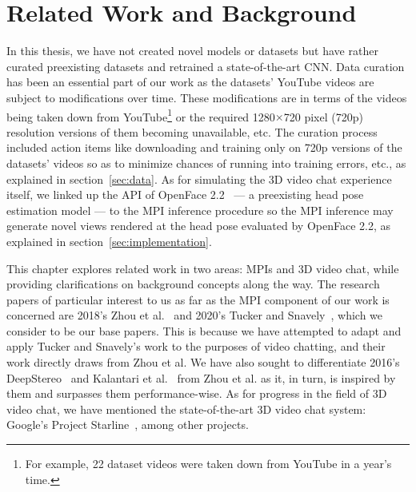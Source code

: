 \chapter{Related Work and Background}\label{ch2:related-work-background}

In this thesis, we have not created novel models or datasets but have rather curated preexisting datasets and retrained a state-of-the-art CNN. Data curation has been an essential part of our work as the datasets' YouTube videos are subject to modifications over time. These modifications are in terms of the videos being taken down from YouTube\footnote{For example, 22 dataset videos were taken down from YouTube in a year's time.} or the required 1280$\times$720 pixel (720p) resolution versions of them becoming unavailable, etc. The curation process included action items like downloading and training only on 720p versions of the datasets' videos so as to minimize chances of running into training errors, etc., as explained in section~\ref{sec:data}. As for simulating the 3D video chat experience itself, we linked up the API of OpenFace 2.2~\cite{baltrusaitis_openface_2018} --- a preexisting head pose estimation model --- to the MPI inference procedure so the MPI inference may generate novel views rendered at the head pose evaluated by OpenFace 2.2, as explained in section~\ref{sec:implementation}.

This chapter explores related work in two areas: MPIs and 3D video chat, while providing clarifications on background concepts along the way. The research papers of particular interest to us as far as the MPI component of our work is concerned are 2018's Zhou et al.~\cite{zhou2018stereo} and 2020's Tucker and Snavely~\cite{single_view_mpi}, which we consider to be our base papers. This is because we have attempted to adapt and apply Tucker and Snavely's work to the purposes of video chatting, and their work directly draws from Zhou et al. We have also sought to differentiate 2016's DeepStereo~\cite{deep_stereo_2016} and Kalantari et al.~\cite{kalantari_2016} from Zhou et al. as it, in turn, is inspired by them and surpasses them performance-wise. As for progress in the field of 3D video chat, we have mentioned the state-of-the-art 3D video chat system: Google's Project Starline~\cite{lawrence_project_2021}, among other projects.


